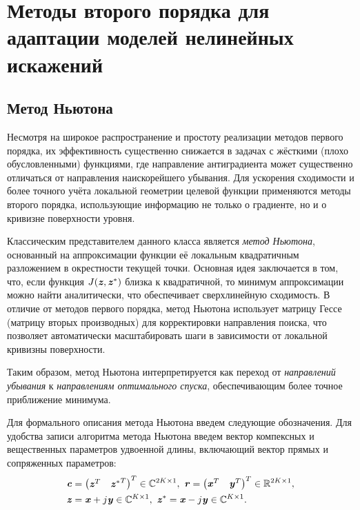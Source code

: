 \section{Методы второго порядка для адаптации моделей нелинейных искажений}

\subsection{Метод Ньютона} \label{subsec:newton}

Несмотря на широкое распространение и простоту реализации методов первого порядка, их эффективность существенно снижается в задачах с жёсткими (плохо обусловленными) функциями, где направление антиградиента может существенно отличаться от направления наискорейшего убывания. Для ускорения сходимости и более точного учёта локальной геометрии целевой функции применяются методы второго порядка, использующие информацию не только о градиенте, но и о кривизне поверхности уровня. 

Классическим представителем данного класса является \textit{метод Ньютона}, основанный на аппроксимации функции её локальным квадратичным разложением в окрестности текущей точки. Основная идея заключается в том, что, если функция \(J(\textbf{\textit{z}}, \textbf{\textit{z}}^*)\) близка к квадратичной, то минимум аппроксимации можно найти аналитически, что обеспечивает сверхлинейную сходимость. В отличие от методов первого порядка, метод Ньютона использует матрицу Гессе (матрицу вторых производных) для корректировки направления поиска, что позволяет автоматически масштабировать шаги в зависимости от локальной кривизны поверхности. 

Таким образом, метод Ньютона интерпретируется как переход от \emph{направлений убывания} к \emph{направлениям оптимального спуска}, обеспечивающим более точное приближение минимума. 

Для формального описания метода Ньютона введем следующие обозначения. Для удобства записи алгоритма метода Ньютона введем вектор компексных и вещественных параметров удвоенной длины, включающий вектор прямых и сопряженных параметров:
\begin{align}
	&\textbf{\textit{c}}=\begin{pmatrix}
		\textbf{\textit{z}}^T & {\textbf{\textit{z}}^*}^T
	\end{pmatrix}^T\in\mathbb{C}^{2K\times1}, \text{	}
	\textbf{\textit{r}}=\begin{pmatrix}
		\textbf{\textit{x}}^T & \textbf{\textit{y}}^T
	\end{pmatrix}^T\in\mathbb{R}^{2K\times1}, \\
	&\textbf{\textit{z}}=\textbf{\textit{x}}+j\textbf{\textit{y}}\in\mathbb{C}^{K\times1}, \text{	} \textbf{\textit{z}}^*=\textbf{\textit{x}}-j\textbf{\textit{y}}\in\mathbb{C}^{K\times1}.
	\label{param_vector_double}
\end{align}

